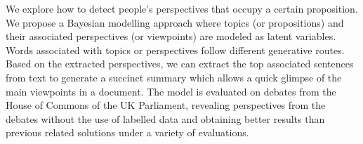 We explore how to detect people's perspectives that occupy a certain proposition. We propose a Bayesian modelling approach where topics (or propositions) and their associated perspectives (or viewpoints) are modeled as latent variables. Words associated with topics or perspectives follow different generative routes. Based on the extracted perspectives, we can extract the top associated sentences from text to generate a succinct summary which allows a quick glimpse of the main viewpoints in a document. The model is evaluated on debates from the House of Commons of the UK Parliament, revealing perspectives from the debates without the use of labelled data and obtaining better results than previous related solutions under a variety of evaluations.
